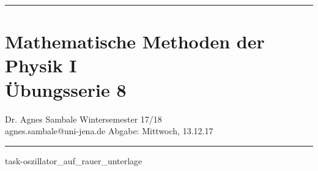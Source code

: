 \documentclass[a4paper,fleqn, 10pt]{article}
\begin{document}
	\pagestyle{empty}

	\hrule
	\section*{\centering Mathematische Methoden der Physik I \\ Übungsserie 8}
	\medskip
	Dr. Agnes Sambale \hfill Wintersemester 17/18\\
	agnes.sambale@uni-jena.de \hfill Abgabe: Mittwoch, 13.12.17
	\bigskip
	\hrule
	\bigskip
	\bigskip

	\atiShowSolutionsfalse

	
	
	\newpage
	{task-oszillator_auf_rauer_unterlage}





\end{document}
